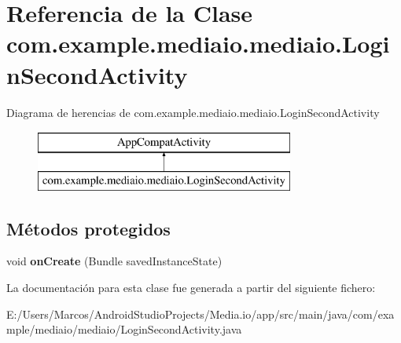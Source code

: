 \hypertarget{classcom_1_1example_1_1mediaio_1_1mediaio_1_1_login_second_activity}{}\section{Referencia de la Clase com.\+example.\+mediaio.\+mediaio.\+Login\+Second\+Activity}
\label{classcom_1_1example_1_1mediaio_1_1mediaio_1_1_login_second_activity}
Diagrama de herencias de com.\+example.\+mediaio.\+mediaio.\+Login\+Second\+Activity\begin{figure}[H]
\begin{center}
\leavevmode
\includegraphics[height=2.000000cm]{classcom_1_1example_1_1mediaio_1_1mediaio_1_1_login_second_activity}
\end{center}
\end{figure}
\subsection*{Métodos protegidos}
\begin{DoxyCompactItemize}
\item 
\mbox{\label{classcom_1_1example_1_1mediaio_1_1mediaio_1_1_login_second_activity_a3952a1aae2c3366a8318c075a3365494}} 
void {\bfseries on\+Create} (Bundle saved\+Instance\+State)
\end{DoxyCompactItemize}


La documentación para esta clase fue generada a partir del siguiente fichero\+:\begin{DoxyCompactItemize}
\item 
E\+:/\+Users/\+Marcos/\+Android\+Studio\+Projects/\+Media.\+io/app/src/main/java/com/example/mediaio/mediaio/Login\+Second\+Activity.\+java\end{DoxyCompactItemize}
